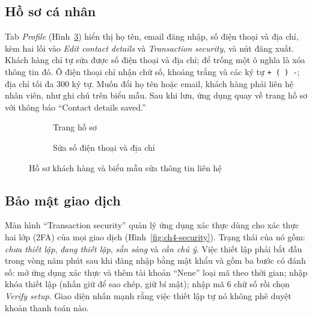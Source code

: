 \subsection{Hồ sơ cá nhân}
\label{sec:ch4-profile}

Tab \textit{Profile} (Hình~\ref{fig:ch4-profile}) hiển thị họ tên, email đăng nhập, số điện thoại và địa chỉ, kèm hai lối vào \textit{Edit contact details} và \textit{Transaction security}, và nút đăng xuất. Khách hàng chỉ tự sửa được số điện thoại và địa chỉ; để trống một ô nghĩa là xóa thông tin đó. Ô điện thoại chỉ nhận chữ số, khoảng trắng và các ký tự \texttt{+ ( ) -}; địa chỉ tối đa 300 ký tự. Muốn đổi họ tên hoặc email, khách hàng phải liên hệ nhân viên, như ghi chú trên biểu mẫu. Sau khi lưu, ứng dụng quay về trang hồ sơ với thông báo ``Contact details saved.''

\begin{figure}[H]
\centering
\begin{subfigure}[t]{0.4\textwidth}
  \centering
  \caption{Trang hồ sơ}
  \label{fig:ch4-profile-page}
\end{subfigure}\hspace{0.05\textwidth}%
\begin{subfigure}[t]{0.4\textwidth}
  \centering
  \caption{Sửa số điện thoại và địa chỉ}
  \label{fig:ch4-profile-contact}
\end{subfigure}
\caption{Hồ sơ khách hàng và biểu mẫu sửa thông tin liên hệ}
\label{fig:ch4-profile}
\end{figure}

\subsection{Bảo mật giao dịch}
\label{sec:ch4-security}

Màn hình ``Transaction security'' quản lý ứng dụng xác thực dùng cho xác thực hai lớp (2FA) của mọi giao dịch (Hình~\ref{fig:ch4-security}). Trạng thái của nó gồm: \emph{chưa thiết lập}, \emph{đang thiết lập}, \emph{sẵn sàng} và \emph{cần chú ý}. Việc thiết lập phải bắt đầu trong vòng năm phút sau khi đăng nhập bằng mật khẩu và gồm ba bước có đánh số: mở ứng dụng xác thực và thêm tài khoản ``Nene'' loại mã theo thời gian; nhập khóa thiết lập (nhấn giữ để sao chép, giữ bí mật); nhập mã 6 chữ số rồi chọn \textit{Verify setup}. Giao diện nhấn mạnh rằng việc thiết lập tự nó không phê duyệt khoản thanh toán nào.

